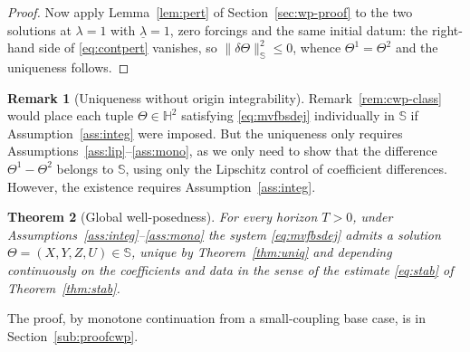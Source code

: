 \documentclass[preprint,12pt]{elsarticle}
\newcommand{\HH}{\mathbb{S}}
\newcommand{\Hweak}{\mathbb{H}^2}
\numberwithin{equation}{section}
\theoremstyle{plain}
\newtheorem{theorem}{Theorem}[section]
\theoremstyle{definition}
\theoremstyle{\PaperRemarkStyle}
\newtheorem{remark}[theorem]{Remark}
\begin{document}
\begin{proof}
Now apply Lemma~\ref{lem:pert} of Section~\ref{sec:wp-proof} to the two solutions at
$\lambda=1$ with $\underline\lambda=1$, zero forcings and the same initial datum:
the right-hand side of \eqref{eq:contpert} vanishes, so
$\|\delta\Theta\|_{\HH}^2\le0$, whence $\Theta^1=\Theta^2$ and the uniqueness follows.
\end{proof}

\begin{remark}[Uniqueness without origin integrability]\label{rem:uniq-no-integ}
Remark~\ref{rem:cwp-class} would place each tuple $\Theta\in\Hweak$ satisfying
\eqref{eq:mvfbsdej} individually in $\HH$ if Assumption~\ref{ass:integ} were imposed. But the uniqueness only requires
Assumptions~\ref{ass:lip}--\ref{ass:mono}, as we only need to show that the difference
$\Theta^1-\Theta^2$ belongs to $\HH$, using only the Lipschitz control of coefficient
differences. However, the existence requires Assumption~\ref{ass:integ}.
\end{remark}

\begin{theorem}[Global well-posedness]\label{thm:cwp}
For every horizon $T>0$, under Assumptions~\ref{ass:integ}--\ref{ass:mono} the system
\eqref{eq:mvfbsdej} admits a solution $\Theta=(X,Y,Z,U)\in\HH$, unique by
Theorem~\ref{thm:uniq} and depending continuously on the coefficients and data in the
sense of the estimate \eqref{eq:stab} of Theorem~\ref{thm:stab}.
\end{theorem}
\noindent The proof, by monotone continuation from a small-coupling base case, is in
Section~\ref{sub:proofcwp}.
\end{document}
